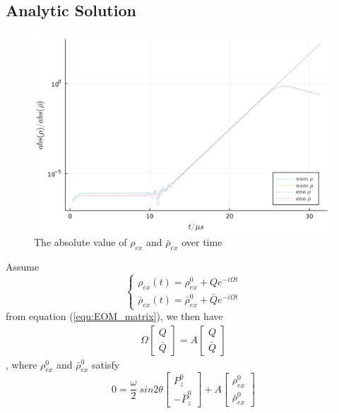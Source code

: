 \documentclass[aps,prd,twocolumn,amsmath,amssymb,groupedaddress]{revtex4-2}
\begin{document}
\subsection{\label{subsec:analytic} Analytic Solution}
\begin{figure}[t]
	\includegraphics[scale=0.28]{compare_rho.png}
	\caption{\label{fig:compare_rho} The absolute value of $\rho_{ex}$ and $\bar{\rho}_{ex}$ over time}
\end{figure}

Assume
\begin{equation}
	\begin{cases}
		\rho_{ex}(t) = \rho^0_{ex} + Q e^{-i\Omega t}
		\\
		\bar{\rho}_{ex}(t) = \bar{\rho}^0_{ex} + \bar{Q} e^{-i\Omega t}
	\end{cases}
\end{equation}
from equation (\ref{equ:EOM_matrix}), we then have
\begin{eqnarray}
	\label{equ:eigenfunction}
	\Omega 
	\begin{bmatrix}
		Q \\ \bar{Q}
	\end{bmatrix}
	= A
	\begin{bmatrix}
		Q \\ \bar{Q}
	\end{bmatrix}
\end{eqnarray}, where $\rho^0_{ex}$ and $\bar{\rho}^0_{ex}$ satisfy
\begin{equation}
	\label{equ:rho0}
	0= \frac{\omega}{2} ~sin2\theta \begin{bmatrix}
		P_{z}^0 \\ -\bar{P}_{z}^0
	\end{bmatrix}  + 
	A \begin{bmatrix} \rho^0_{ex} \\ \bar{\rho}^0_{ex}
	\end{bmatrix}
\end{equation}
\end{document}
